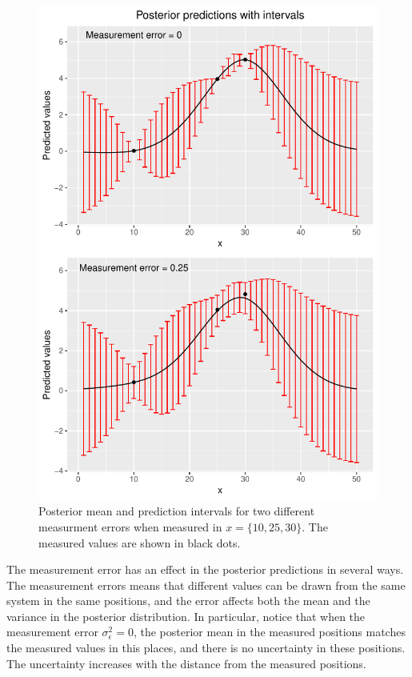 \begin{figure}
    \centering
    \includegraphics{figures/predictions.pdf}
    \caption{Posterior mean and prediction intervals for two different measurment errors when measured in $x = \{10,25,30\}$. The measured values are shown in black dots.}
    \label{fig:predictions}
\end{figure}

The measurement error has an effect in the posterior predictions in several ways. The measurement errors means that different values can be drawn from the same system in the same positions, and the error affects both the mean and the variance in the posterior distribution. In particular, notice that when the measurement error $\sigma^2_{\epsilon} = 0$, the posterior mean in the measured positions matches the measured values in this places, and there is no uncertainty in these positions. The uncertainty increases with the distance from the measured positions.

